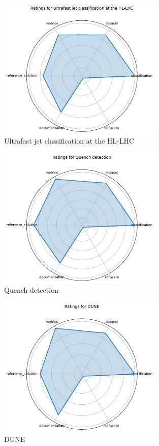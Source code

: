 \documentclass{article}
\begin{document}
\begin{figure}[h!]
  \centering
  \includegraphics[width=0.7\textwidth]{Ultrafast jet classification at the HL-LHC_radar.pdf}
  \caption{Ultrafast jet classification at the HL-LHC}
\end{figure}

\begin{figure}[h!]
  \centering
  \includegraphics[width=0.7\textwidth]{Quench detection_radar.pdf}
  \caption{Quench detection}
\end{figure}

\begin{figure}[h!]
  \centering
  \includegraphics[width=0.7\textwidth]{DUNE_radar.pdf}
  \caption{DUNE}
\end{figure}
\end{document}
